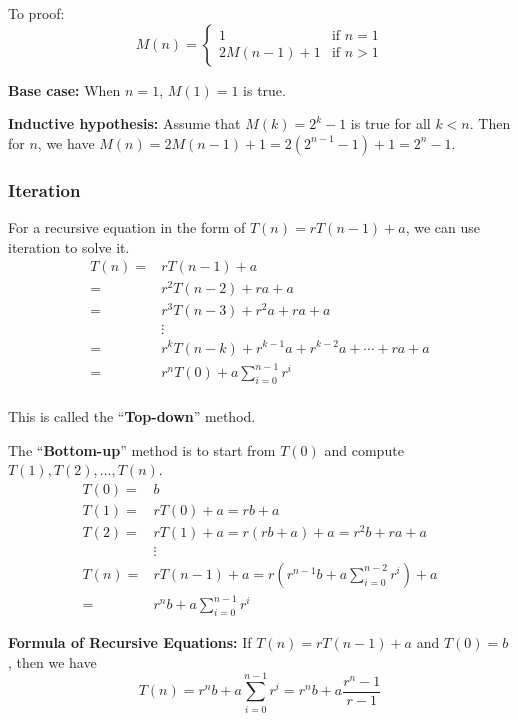 \documentclass[a4paper,12pt]{article}
\begin{document}
To proof:
\begin{equation*}
	M(n) = 
	\begin{cases}
		1 & \text{if } n = 1 \\
		2M(n-1) + 1 & \text{if } n > 1
	\end{cases}
\end{equation*}

\textbf{Base case:} 
When $n = 1$, $M(1) = 1$ is true.

\textbf{Inductive hypothesis:}
Assume that $M(k) = 2^k - 1$ is true for all $k < n$.
Then for $n$, we have $M(n) = 2M(n-1) + 1 = 2(2^{n-1} - 1) + 1 = 2^n - 1$.

\subsubsection{Iteration}

For a recursive equation in the form of $T(n) = rT(n-1) + a$, we can use iteration to solve it.
\begin{align*}
	T(n) =& rT(n-1) + a \\
	=& r^2T(n-2) + ra + a \\
	=& r^3T(n-3) + r^2a + ra + a \\
	&\vdots \\
	=& r^kT(n-k) + r^{k-1}a + r^{k-2}a + \cdots + ra + a \\
	=& r^nT(0) + a \sum_{i=0}^{n-1} r^i \\
\end{align*}

This is called the ``\textbf{Top-down}'' method.

The ``\textbf{Bottom-up}'' method is to start from $T(0)$ and compute $T(1), T(2), ..., T(n)$.
\begin{align*}
	T(0) =& b \\
	T(1) =& rT(0) + a = rb + a \\
	T(2) =& rT(1) + a = r(rb + a) + a = r^2b + ra + a \\
	&\vdots \\
	T(n) =& rT(n-1) + a = r(r^{n-1}b + a \sum_{i=0}^{n-2} r^i) + a \\
	=& r^n b + a \sum_{i=0}^{n-1} r^i
\end{align*}

\textbf{Formula of Recursive Equations:}
If $T(n) = rT(n-1) + a$ and $T(0) = b$, then we have
\begin{equation*}
	T(n) = r^n b + a \sum_{i=0}^{n-1} r^i = r^n b + a \frac{r^n - 1}{r - 1}
\end{equation*}
\end{document}
